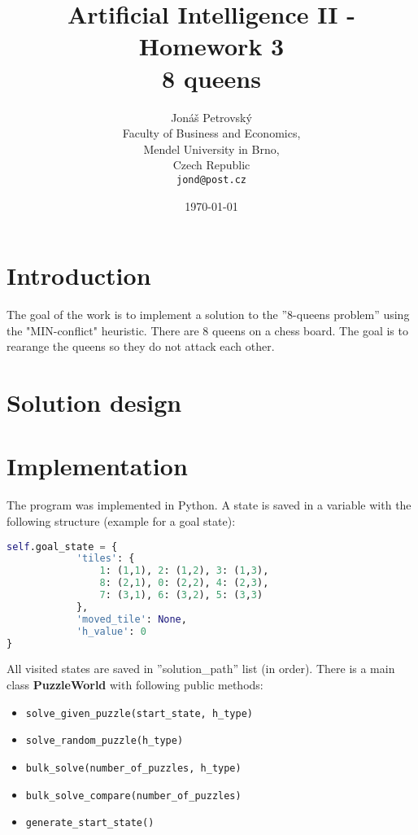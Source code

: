 \documentclass[a4paper]{article}
\begin{document}
\title{\vspace{-1.0cm}Artificial Intelligence II - Homework 3 \\ \textbf{8 queens}}
\author{Jonáš Petrovský\\
        Faculty of Business and Economics,\\
		Mendel University in Brno,\\
		Czech Republic \\
		\texttt{jond@post.cz}}
\date{\today}
\maketitle

\section{Introduction}
The goal of the work is to implement a solution to the ''8-queens problem'' using the "MIN-conflict" heuristic. There are 8 queens on a chess board. The goal is to rearange the queens so they do not attack each other.

\section{Solution design}

\section{Implementation}
The program was implemented in Python. A state is saved in a variable with the following structure (example for a goal state):
\begin{lstlisting}[language=python]
self.goal_state = {
            'tiles': {
                1: (1,1), 2: (1,2), 3: (1,3),
                8: (2,1), 0: (2,2), 4: (2,3),
                7: (3,1), 6: (3,2), 5: (3,3)
            },
            'moved_tile': None,
            'h_value': 0
}
\end{lstlisting}
All visited states are saved in ''solution\_path'' list (in order). There is a main class \textbf{PuzzleWorld} with following public methods: 
\begin{itemize}
\item \verb|solve_given_puzzle(start_state, h_type)|
\item \verb|solve_random_puzzle(h_type)|
\item \verb|bulk_solve(number_of_puzzles, h_type)|
\item \verb|bulk_solve_compare(number_of_puzzles)|
\item \verb|generate_start_state()|
\end{itemize}
\end{document}
